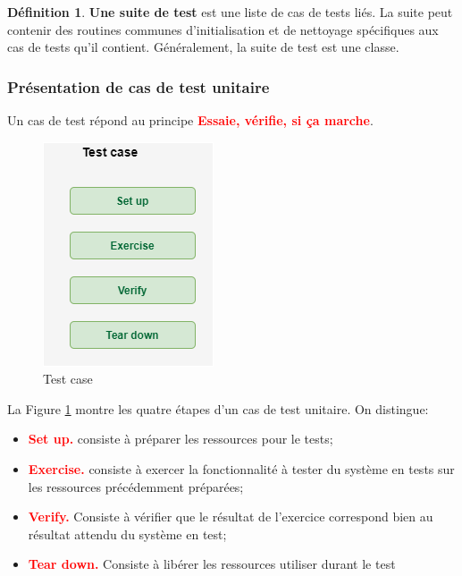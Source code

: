 \documentclass[a4paper,11pt,french]{refart}
\theoremstyle{definition}
\newtheorem{definition}{Définition}[section]
\begin{document}
\begin{definition}{ \textbf{Une suite de test}}
 est une liste de cas de tests liés. La suite peut contenir des routines communes d'initialisation et de nettoyage spécifiques aux cas de tests qu'il contient. Généralement, la suite de test est une classe.
 \end{definition}

\subsubsection{Présentation de cas de test unitaire}
Un cas de test  répond au principe \textbf{\textcolor{red}{Essaie, vérifie, si ça marche}}.
 \begin{figure}[!htp]
  \begin{center}
  \includegraphics[width=0.5\linewidth]{./testcase.png}
  \caption{Test case}
  \label{fig:testcase}
  \end{center}
\end{figure}
La Figure \ref{fig:testcase}   montre les quatre étapes d'un cas de test unitaire. On distingue:
\begin{itemize}
    \item \textbf{\textcolor{red}{Set up.}} consiste à  préparer les ressources pour le tests;
    \item \textbf{\textcolor{red}{Exercise.}} consiste à exercer la fonctionnalité à tester du  système en tests  sur les ressources précédemment préparées;
    \item \textbf{\textcolor{red}{Verify.}} Consiste à vérifier que le résultat de l'exercice correspond bien au résultat attendu du système en test;
    \item \textbf{\textcolor{red}{Tear down.}} Consiste à libérer les ressources utiliser durant le test
\end{itemize}
\end{document}
